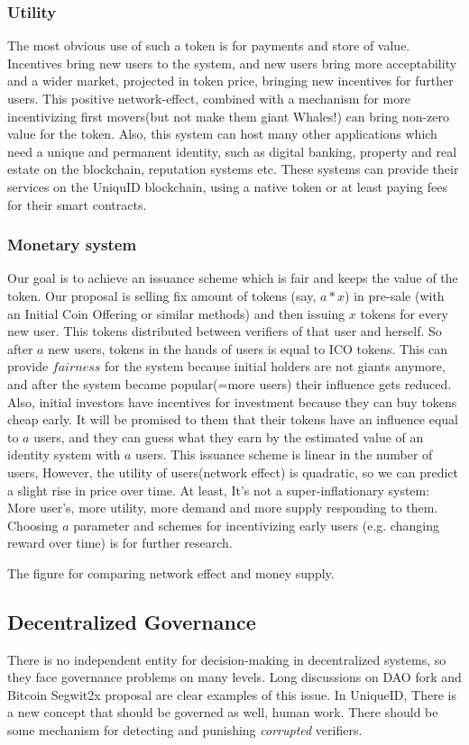 \documentclass[conference]{IEEEtran}
\begin{document}
\subsubsection{Utility} 
The most obvious use of such a token is for payments and store of value. Incentives bring new users to the system, and new users bring more acceptability and a wider market, projected in token price, bringing new incentives for further users. This positive network-effect, combined with a mechanism for more incentivizing first movers(but not make them giant Whales!) can bring non-zero value for the token. Also, this system can host many other applications which need a unique and permanent identity, such as digital banking, property and real estate on the blockchain, reputation systems etc. These systems can provide their services on the UniquID blockchain, using a native token or at least paying fees for their smart contracts.

\subsubsection{Monetary system}
Our goal is to achieve an issuance scheme which is fair and keeps the value of the token. Our proposal is selling fix amount of tokens (say, $a*x$) in pre-sale (with an Initial Coin Offering or similar methods) and then issuing $x$ tokens for every new user. This tokens distributed between verifiers of that user and herself. So after $a$ new users, tokens in the hands of users is equal to ICO tokens. This can provide $fairness$ for the system because initial holders are not giants anymore, and after the system became popular(=more users) their influence gets reduced. Also, initial investors have incentives for investment because they can buy tokens cheap early. It will be promised to them that their tokens have an influence equal to $a$ users, and they can guess what they earn by the estimated value of an identity system with $a$ users. This issuance scheme is linear in the number of users, However, the utility of users(network effect) is quadratic, so we can predict a slight rise in price over time. At least, It's not a super-inflationary system: More user's, more utility, more demand and more supply responding to them. Choosing $a$ parameter and schemes for incentivizing early users (e.g. changing reward over time) is for further research.




The figure for comparing network effect and money supply.

\subsection{Decentralized Governance}
There is no independent entity for decision-making in decentralized systems, so they face governance problems on many levels. Long discussions on  DAO fork and Bitcoin Segwit2x proposal are clear examples of this issue. In UniqueID, There is a new concept that should be governed as well, human work. There should be some mechanism for detecting and punishing \textit{corrupted} verifiers.
\end{document}
